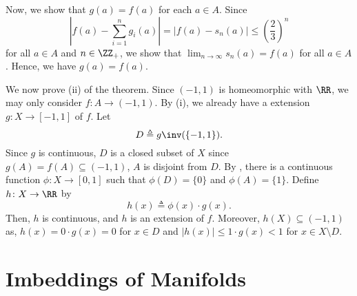 \documentclass[MAS331_Note.tex]{subfiles}
\begin{document}
{    Now, we show that $g(a) = f(a)$ for each $a \in A$. Since
    \[
        \left|f(a) - \sum_{i=1}^{n} g_i(a)\right| = |f(a) - s_n(a)| \le
        \left(\frac{2}{3}\right)^n
    \]
    for all $a \in A$ and $n \in \ZZ_+$, we show that $\lim_{n \to \infty} s_n(a)
    = f(a)$ for all $a \in A$. Hence, we have $g(a) = f(a)$. \checkmark

    We now prove (ii) of the theorem.
    Since $(-1, 1)$ is homeomorphic with $\RR$, we may only consider
    $f \colon A \to (-1, 1)$. By (i), we already have a extension $g \colon
    X \to [-1, 1]$ of $f$. Let
    \[
        D \triangleq g\inv(\{-1, 1\})\text{.}
    \]
    Since $g$ is continuous, $D$ is a closed subset of $X$ since $g(A) = f(A)
    \subseteq (-1, 1)$, $A$ is disjoint from $D$. By ,
    there is a continuous function $\phi \colon X \to [0, 1]$ such that
    $\phi(D) = \{0\}$ and $\phi(A) = \{1\}$. Define $h \colon X \to \RR$ by
    \[
        h(x) \triangleq \phi(x) \cdot g(x)\text{.}
    \]
    Then, $h$ is continuous, and $h$ is an extension of $f$.
    Moreover, $h(X) \subseteq (-1, 1)$ as,
    $h(x) = 0 \cdot g(x) = 0$ for $x \in D$ and $|h(x)| \le 1 \cdot g(x) < 1$
    for $x \in X \setminus D$.
}

\section{Imbeddings of Manifolds}



\end{document}
